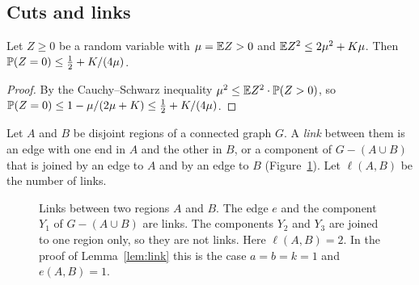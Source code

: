 \subsection{Cuts and links}

\begin{lemma}\label{lem:second}
Let $Z\ge0$ be a random variable with $\mu=\mathbb{E} Z>0$ and $\mathbb{E} Z^{2}\le2\mu^{2}+K\mu$. Then
$\mathbb{P}(Z=0)\le\tfrac12+K/(4\mu)$.
\end{lemma}

\begin{proof}
By the Cauchy--Schwarz inequality $\mu^{2}\le\mathbb{E} Z^{2}\cdot\mathbb{P}(Z>0)$, so
$\mathbb{P}(Z=0)\le1-\mu/(2\mu+K)\le\tfrac12+K/(4\mu)$.
\end{proof}

Let $A$ and $B$ be disjoint regions of a connected graph $G$. A \emph{link} between them is an edge
with one end in $A$ and the other in $B$, or a component of $G-(A\cup B)$ that is joined by an edge
to $A$ and by an edge to $B$ (Figure~\ref{fig:links}). Let $\ell(A,B)$ be the number of links.

\begin{figure}[ht]
\centering
{}
\caption{Links between two regions $A$ and $B$. The edge $e$ and the component $Y_1$ of
$G-(A\cup B)$ are links. The components $Y_2$ and $Y_3$ are joined to one region only, so they are
not links. Here $\ell(A,B)=2$. In the proof of Lemma~\ref{lem:link} this is the case $a=b=k=1$
and $e(A,B)=1$.}
\label{fig:links}
\end{figure}

